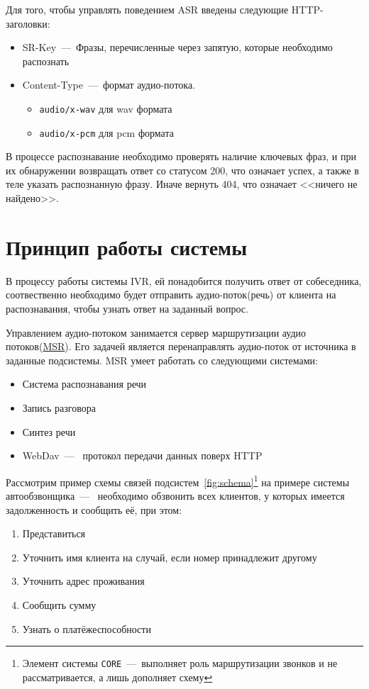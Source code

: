 Для того, чтобы управлять поведением ASR введены следующие HTTP-заголовки:
\begin{itemize}
    \item SR-Key~---~Фразы, перечисленные через запятую, которые необходимо распознать
    \item Content-Type~---~формат аудио-потока.
    \begin{itemize}
        \item {\tt audio/x-wav} для wav формата
        \item {\tt audio/x-pcm} для pcm формата
    \end{itemize}
\end{itemize}

В процессе распознавание необходимо проверять наличие ключевых фраз, и при их
обнаружении возвращать ответ со статусом 200, что означает успех, а также в теле
указать распознанную фразу. Иначе вернуть 404, что означает <<ничего не найдено>>.

\section{Принцип работы системы}
В процессу работы системы IVR, ей понадобится получить ответ от собеседника,
соотвественно необходимо будет отправить аудио-поток(речь) от клиента на распознавания,
чтобы узнать ответ на заданный вопрос.

Управлением аудио-потоком занимается сервер маршрутизации аудио потоков(\hyperlink{msr}{MSR}).
Его задачей является перенаправлять аудио-поток от источника в заданные подсистемы.
MSR умеет работать со следующими системами:
\begin{itemize}
    \item Система распознавания речи
    \item Запись разговора
    \item Синтез речи
    \item WebDav~---~ протокол передачи данных поверх HTTP
\end{itemize}

Рассмотрим пример схемы связей подсистем~\ref{fig:schema}\footnote{Элемент системы
\texttt{CORE}~---~выполняет роль маршрутизации звонков и не рассматривается, а лишь
дополняет схему} на примере
системы автообзвонщика~---~ необходимо обзвонить всех клиентов, у которых имеется
задолженность и сообщить её, при этом:
\begin{enumerate}
    \item Представиться
    \item Уточнить имя клиента на случай, если номер принадлежит другому
    \item Уточнить адрес проживания
    \item Сообщить сумму
    \item Узнать о платёжеспособности
\end{enumerate}

